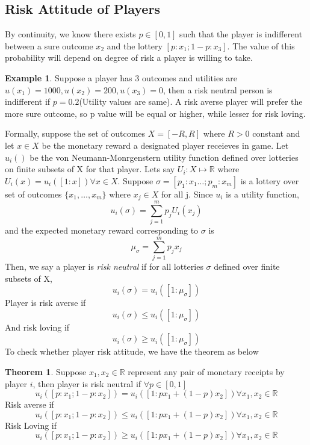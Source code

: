 \documentclass{article}
\theoremstyle{definition}
\newtheorem{theorem}{Theorem}[section]
\newtheorem{example}{Example}[section]
\begin{document}
\subsection{Risk Attitude of Players}
By continuity, we know there exists $p\in [0,1]$ such that the player is indifferent between a sure outcome $x_2$ and the lottery $[p:x_1;1-p:x_3]$. The value of this probability will depend on degree of risk a player is willing to take.\\
\begin{example} 
Suppose a player has 3 outcomes and utilities are $u(x_1)=1000, u(x_2)=200, u(x_3)=0$, then a risk neutral person is indifferent if $p= 0.2$(Utility values are same). A risk averse player will prefer the more sure outcome, so p value will be equal or higher, while lesser for risk loving.
\end{example}
Formally, suppose the set of outcomes $X = [-R,R]$ where $R>0$ constant and let $x\in X$ be the monetary reward a designated player receieves in game. Let $u_i()$ be the von Neumann-Monrgenstern utility function defined over lotteries on finite subsets of X for that player. Lets say $U_i: X\mapsto \mathbb{R}$ where $U_i(x) = u_i([1:x]) \forall x\in X$. Suppose $\sigma = [p_1:x_1\dots; p_m:x_m]$ is a lottery over set of outcomes $\{x_1,
\dots, x_m\}$ where $x_j\in X$ for all j. Since $u_i$ is a utility function, $$u_i(\sigma) = \sum_{j=1}^m p_j U_i(x_j)$$ and the expected monetary reward corresponding to $\sigma$ is $$\mu_{\sigma} = \sum_{j=1}^m p_jx_j$$
Then, we say a player is \textit{risk neutral} if for all lotteries $\sigma$ defined over finite subsets of X, $$u_i(\sigma) = u_i([1:\mu_{\sigma}])$$
Player is risk averse if $$u_i(\sigma) \leq u_i([1:\mu_{\sigma}])$$ And risk loving if $$u_i(\sigma) \geq u_i([1:\mu_{\sigma}])$$
To check whether player risk attitude, we have the theorem as below
\begin{theorem}
Suppose $x_1,x_2\in \mathbb{R}$ represent any pair of monetary receipts by player $i$, then player is risk neutral if $\forall p\in[0,1]$
$$u_i([p:x_1;1-p:x_2]) = u_i([1:px_1+(1-p)x_2]) \forall x_1,x_2\in \mathbb{R}$$ Risk averse if 
$$u_i([p:x_1;1-p:x_2]) \leq u_i([1:px_1+(1-p)x_2]) \forall x_1,x_2\in \mathbb{R}$$
Risk Loving if $$u_i([p:x_1;1-p:x_2]) \geq u_i([1:px_1+(1-p)x_2]) \forall x_1,x_2\in \mathbb{R}$$
\end{theorem}
\end{document}
